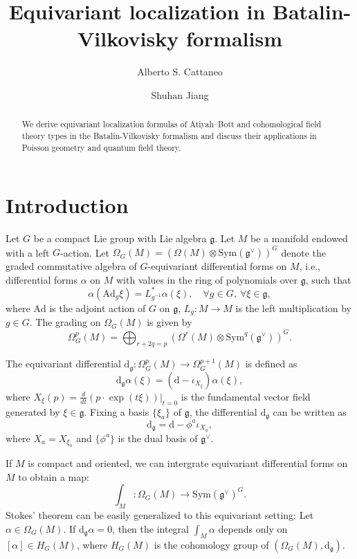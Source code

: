 \documentclass[12pt]{amsart}
\title{Equivariant localization in Batalin-Vilkovisky formalism}
\author{Alberto S. Cattaneo}
\author{Shuhan Jiang}
\numberwithin{table}{section}
\numberwithin{equation}{section}
\theoremstyle{plain}
\newcommand{\dg}{\mathrm{d}_{\mathfrak{g}}}
\newcommand{\Ad}{\mathrm{Ad}}
\newcommand{\Sym}{\mathrm{Sym}}
\begin{document}
	
	\begin{abstract}
		We derive equivariant localization formulas of Atiyah--Bott and cohomological field theory types in the Batalin-Vilkovisky formalism and discuss their applications in Poisson geometry and quantum field theory.
	\end{abstract}
	
	\maketitle
	
\section{Introduction}

Let $G$ be a compact Lie group with Lie algebra $\mathfrak{g}$.
Let $M$ be a manifold endowed with a left $G$-action. 
Let $\Omega_G(M)=(\Omega(M) \otimes \Sym(\mathfrak{g}^{\vee}))^G$ denote the graded commutative algebra of $G$-equivariant differential forms on $M$, i.e., differential forms $\alpha$ on $M$ with values in the ring of polynomials over $\mathfrak{g}$, such that
\[
\alpha(\Ad_g \xi) = L_{g^{-1}}^* \alpha(\xi), \quad \forall g \in G,~\forall \xi \in \mathfrak{g},
\] 
where $\Ad$ is the adjoint action of $G$ on $\mathfrak{g}$, $L_g\colon M \rightarrow M$ is the left multiplication by $g \in G$. The grading on $\Omega_G(M)$ is given by 
\[
\Omega_G^p(M) = \bigoplus_{r+2q=p} (\Omega^r(M) \otimes \Sym^q(\mathfrak{g}^{\vee}))^G.
\]

The equivariant differential $\dg\colon \Omega_G^p(M) \rightarrow \Omega_G^{p+1}(M)$ is defined as
\[
\dg \alpha(\xi) = (\mathrm{d} - \iota_{X_{\xi}})\alpha(\xi),
\]
where $X_{\xi}(p) = \frac{d}{dt} (p \cdot \exp(t\xi))|_{t=0}$ is the fundamental vector field generated by $\xi \in \mathfrak{g}$. Fixing a basis $\{\xi_a\}$ of $\mathfrak{g}$, the differential $\dg$ can be written as
\[
\dg = \mathrm{d} - \phi^a \iota_{X_a},
\]
where $X_a = X_{\xi_a}$ and $\{\phi^a\}$ is the dual basis of $\mathfrak{g}^{\vee}$.

If $M$ is compact and oriented, we can intergrate equivariant differential forms on $M$ to obtain a map:
\[
\int_M\colon \Omega_G(M) \rightarrow \Sym(\mathfrak{g}^{\vee})^G.
\]
Stokes' theorem can be easily generalized to this equivariant setting: Let $\alpha \in \Omega_G(M)$. If $\dg\alpha = 0$, then the integral
$
\int_M \alpha
$
depends only on $[\alpha] \in H_{G}(M)$, where $H_G(M)$ is the cohomology group of $(\Omega_G(M), \dg)$.
\end{document}
